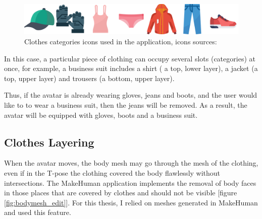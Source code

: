 \documentclass[a4paper]{report}
\begin{document}
 \begin{figure}[H]
  \includegraphics[width=\textwidth, keepaspectratio]{images/ClothesCombination/category_buttons.png}
  \caption{Clothes categories icons used in the application, icons sources: \cite{iconCap}\cite{iconGLoves}\cite{iconUndershirt}\cite{iconUnderwear}\cite{iconJacket}\cite{iconJeans}\cite{iconShoe}
  } 
  \label{fig:clothesIcons}
\end{figure}


In this case, a particular piece of clothing can occupy several slots (categories) at once, for example, a business suit includes a shirt ( a top, lower layer), a jacket (a top, upper layer) and trousers (a bottom, upper layer).

Thus, if the avatar is already wearing gloves, jeans and boots, and the user would like to to wear a business suit, then the jeans will be removed. As a result, the avatar will be equipped with gloves, boots and a business suit.



\subsection{Clothes Layering}

\qquad When the avatar moves, the body mesh may go through the mesh of the clothing, even if in the T-pose the clothing covered the body flawlessly without intersections. The MakeHuman application implements the removal of body faces in those places that are covered by clothes and should not be visible [figure \ref{fig:bodymesh_edit}].
For this thesis, I relied on meshes generated in MakeHuman and used this feature.
\end{document}
